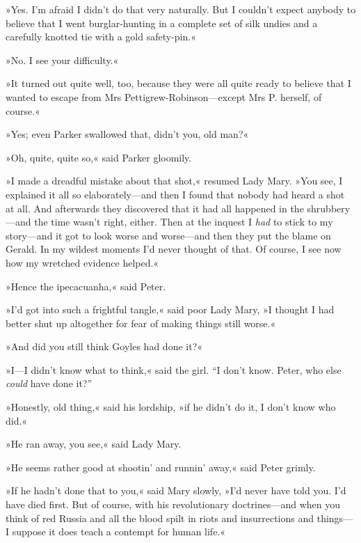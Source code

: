 »Yes. I'm afraid I didn't do that very naturally. But I couldn't expect anybody to believe that I went burglar-hunting in a complete set of silk undies and a carefully knotted tie with a gold safety-pin.«

»No. I see your difficulty.«

»It turned out quite well, too, because they were all quite ready to believe that I wanted to escape from Mrs Pettigrew-Robinson\allowbreak---\allowbreak except Mrs P. herself, of course.«

»Yes; even Parker swallowed that, didn't you, old man?«

»Oh, quite, quite so,« said Parker gloomily.

»I made a dreadful mistake about that shot,« resumed Lady Mary. »You see, I explained it all so elaborately\allowbreak---\allowbreak and then I found that nobody had heard a shot at all. And afterwards they discovered that it had all happened in the shrubbery\allowbreak---\allowbreak and the time wasn't right, either. Then at the inquest I \textit{had} to stick to my story\allowbreak---\allowbreak and it got to look worse and worse\allowbreak---\allowbreak and then they put the blame on Gerald. In my wildest moments I'd never thought of that. Of course, I see now how my wretched evidence helped.«

»Hence the ipecacuanha,« said Peter.

»I'd got into such a frightful tangle,« said poor Lady Mary, »I thought I had better shut up altogether for fear of making things still worse.«

»And did you still think Goyles had done it?«

»I\allowbreak---\allowbreak I didn't know what to think,« said the girl. \enquote{I don't know. Peter, who else \textit{could} have done it?}

»Honestly, old thing,« said his lordship, »if he didn't do it, I don't know who did.«

»He ran away, you see,« said Lady Mary.

»He seems rather good at shootin' and runnin' away,« said Peter grimly.

»If he hadn't done that to you,« said Mary slowly, »I'd never have told you. I'd have died first. But of course, with his revolutionary doctrines\allowbreak---\allowbreak and when you think of red Russia and all the blood spilt in riots and insurrections and things\allowbreak---\allowbreak I suppose it does teach a contempt for human life.«

